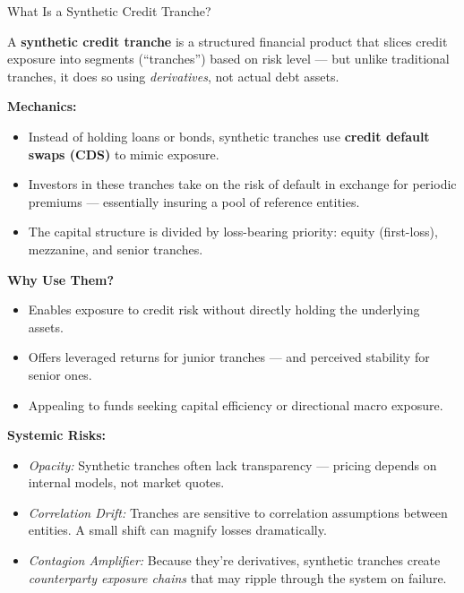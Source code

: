 \begin{TechnicalSidebar}{What Is a Synthetic Credit Tranche?}

  A \textbf{synthetic credit tranche} is a structured financial product that slices credit exposure into 
  segments (“tranches”) based on risk level — but unlike traditional tranches, it does so using 
  \textit{derivatives}, not actual debt assets.

  \medskip
  
  \textbf{Mechanics:}

  \medskip

  \begin{itemize}
    \item Instead of holding loans or bonds, synthetic tranches use \textbf{credit default swaps (CDS)} 
    to mimic exposure.
    \item Investors in these tranches take on the risk of default in exchange for periodic premiums — 
    essentially insuring a pool of reference entities.
    \item The capital structure is divided by loss-bearing priority: equity (first-loss), mezzanine, 
    and senior tranches.
  \end{itemize}
  
  \medskip

  \textbf{Why Use Them?}

  \medskip

  \begin{itemize}
    \item Enables exposure to credit risk without directly holding the underlying assets.
    \item Offers leveraged returns for junior tranches — and perceived stability for senior ones.
    \item Appealing to funds seeking capital efficiency or directional macro exposure.
  \end{itemize}

  \medskip
  
  \textbf{Systemic Risks:}

  \medskip

  \begin{itemize}
    \item \textit{Opacity:} Synthetic tranches often lack transparency — pricing depends on internal models, 
    not market quotes.
    \item \textit{Correlation Drift:} Tranches are sensitive to correlation assumptions between entities. A 
    small shift can magnify losses dramatically.
    \item \textit{Contagion Amplifier:} Because they're derivatives, synthetic tranches create 
    \textit{counterparty exposure chains} that may ripple through the system on failure.
  \end{itemize}
  

\end{TechnicalSidebar}
